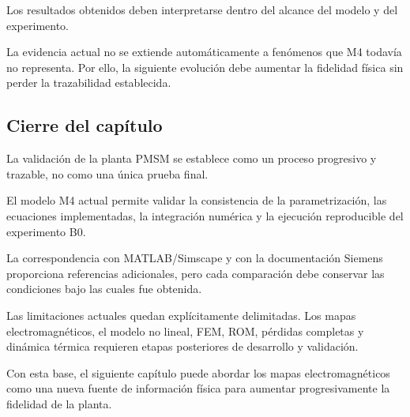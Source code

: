 Los resultados obtenidos deben interpretarse dentro del alcance del modelo y del experimento.

La evidencia actual no se extiende automáticamente a fenómenos que M4 todavía no representa. Por ello, la siguiente evolución debe aumentar la fidelidad física sin perder la trazabilidad establecida.

\subsection{Cierre del capítulo}

La validación de la planta PMSM se establece como un proceso progresivo y trazable, no como una única prueba final.

El modelo M4 actual permite validar la consistencia de la parametrización, las ecuaciones implementadas, la integración numérica y la ejecución reproducible del experimento B0.

La correspondencia con MATLAB/Simscape y con la documentación Siemens proporciona referencias adicionales, pero cada comparación debe conservar las condiciones bajo las cuales fue obtenida.

Las limitaciones actuales quedan explícitamente delimitadas. Los mapas electromagnéticos, el modelo no lineal, FEM, ROM, pérdidas completas y dinámica térmica requieren etapas posteriores de desarrollo y validación.

Con esta base, el siguiente capítulo puede abordar los mapas electromagnéticos como una nueva fuente de información física para aumentar progresivamente la fidelidad de la planta.
